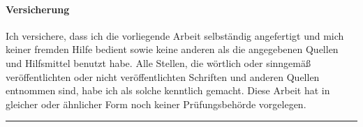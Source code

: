 \paragraph{Versicherung}
Ich versichere, dass ich die vorliegende Arbeit selbständig angefertigt und mich keiner fremden Hilfe bedient sowie keine anderen
als die angegebenen Quellen und Hilfsmittel benutzt habe. Alle Stellen, die wörtlich oder sinngemäß veröffentlichten oder nicht
veröffentlichten Schriften und anderen Quellen entnommen sind, habe ich als solche kenntlich gemacht. Diese Arbeit hat in gleicher
oder ähnlicher Form noch keiner Prüfungsbehörde vorgelegen.

\vspace{1cm}
\noindent\rule{10cm}{0.5pt}
